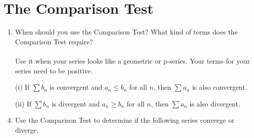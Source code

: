 \documentclass[12pt]{article}
\begin{document}
\section{The Comparison Test}
\begin{enumerate}
    \addtocounter{enumi}{19}\item When should you use the Comparison Test? What kind of terms does the Comparison Test require?
    \\\\Use it when your series looks like a geometric or p-series. Your terms for your series need to be positive.
    \item[(i)] If $\sum b_n$ is convergent  and $a_n \leq b_n$ for all $n$, then $\sum a_n$ is also convergent.
    \item[(ii)] If $\sum b_n$ is divergent   and $a_n \geq b_n$ for all $n$, then $\sum a_n$ is also divergent.
    \item Use the Comparison Test to determine if the following series converge or diverge.
    

\end{enumerate}
\end{document}
